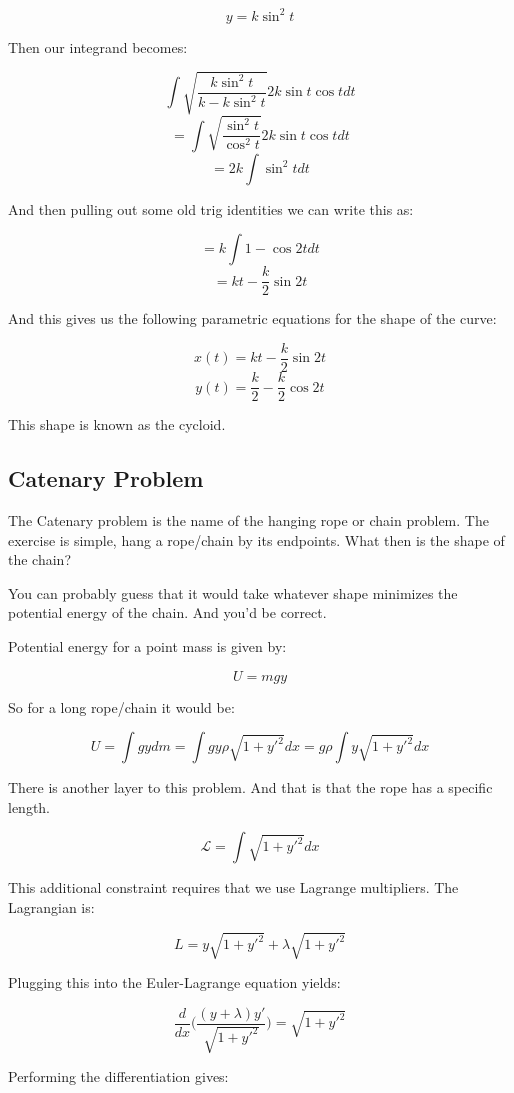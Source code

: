 \documentclass{article}
\begin{document}
$$y = k \sin^2t$$

Then our integrand becomes:

$$\int \sqrt{ \frac{ k \sin^2t }{ k - k \sin^2 t } } 2k \sin t \cos t dt$$
$$ = \int \sqrt{ \frac{ \sin^2 t }{ \cos^2 t } } 2k \sin t \cos t dt$$
$$ = 2k \int \sin^2{ t } dt$$

And then pulling out some old trig identities we can write this as:

$$ = k \int{ 1 - \cos{ 2t } } dt$$
$$ = kt - \frac{ k }{ 2 } \sin{ 2t }$$

And this gives us the following parametric equations for the shape of the curve:

$$x(t) = kt - \frac{ k }{ 2 } \sin{ 2t }$$
$$y(t) =  \frac{ k }{ 2 } - \frac{ k }{ 2 } \cos{ 2t }$$

This shape is known as the cycloid.

%
%
%
\subsection{Catenary Problem}

The Catenary problem is the name of the hanging rope or chain problem.  The exercise is simple, hang a rope/chain by its endpoints.  What then is the shape of the chain?

You can probably guess that it would take whatever shape minimizes the potential energy of the chain.  And you'd be correct.

Potential energy for a point mass is given by:

$$U = mgy$$

So for a long rope/chain it would be:

$$U = \int gydm = \int gy \rho \sqrt{ 1 + y'^2 }dx = g \rho \int y \sqrt{ 1 + y'^2 }dx$$

There is another layer to this problem.  And that is that the rope has a specific length.

$$\mathcal{ L } = \int \sqrt{ 1 + y'^2 } dx$$

This additional constraint requires that we use Lagrange multipliers.  The Lagrangian is:

$$L = y \sqrt{ 1 + y'^2 } + \lambda \sqrt{ 1 + y'^2 }$$

Plugging this into the Euler-Lagrange equation yields:

$$\frac{ d }{ dx } \Big( \frac{ ( y + \lambda ) y' }{ \sqrt{ 1 + y'^2 } } \Big) = \sqrt{ 1 + y'^2 }$$

Performing the differentiation gives:
\end{document}
